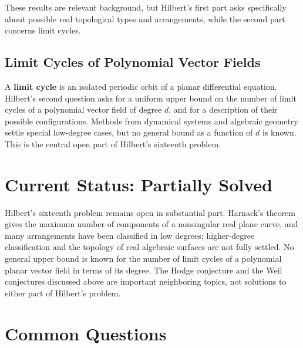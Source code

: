 These results are relevant background, but Hilbert's first part asks specifically about possible real topological types and arrangements, while the second part concerns limit cycles.

\subsection{Limit Cycles of Polynomial Vector Fields}

A \textbf{limit cycle} is an isolated periodic orbit of a planar differential equation. Hilbert's second question asks for a uniform upper bound on the number of limit cycles of a polynomial vector field of degree $d$, and for a description of their possible configurations. Methods from dynamical systems and algebraic geometry settle special low-degree cases, but no general bound as a function of $d$ is known. This is the central open part of Hilbert's sixteenth problem.

\section{Current Status: Partially Solved}

\begin{partiallybox}
Hilbert's sixteenth problem remains open in substantial part. Harnack's theorem gives the maximum number of components of a nonsingular real plane curve, and many arrangements have been classified in low degrees; higher-degree classification and the topology of real algebraic surfaces are not fully settled. No general upper bound is known for the number of limit cycles of a polynomial planar vector field in terms of its degree. The Hodge conjecture and the Weil conjectures discussed above are important neighboring topics, not solutions to either part of Hilbert's problem.
\end{partiallybox}

\section*{Common Questions}

